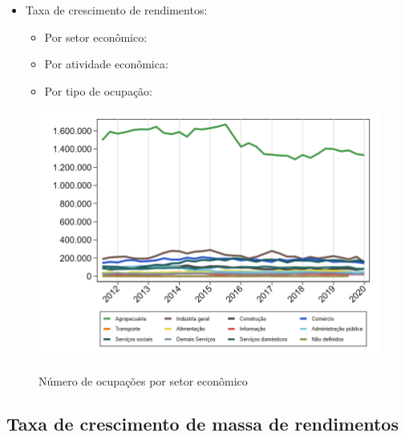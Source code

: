 \documentclass[8pt]{beamer}
\begin{document}
\begin{frame}[label=indice_principal_amz_rural]{}
\begin{itemize}
\item{Taxa de crescimento de rendimentos:
	\begin{itemize}
	\item{Por setor econômico: \hyperlink{amzruralrkngtxrendaporsetor}{}}
	\item{Por atividade econômica: \hyperlink{amzruralrkngtxrendaporatividade}{}}
	\item{Por tipo de ocupação: \hyperlink{amzruralrkngtxrendaporocupacao}{}}
	\end{itemize}
}
\vspace{1mm}

\end{itemize}

\end{frame}

\begin{frame}
\textit{\hyperlink{indice_principal_amz_rural}{}}
\begin{figure}
  \centering
  \includegraphics[width=.85\linewidth]{./../analysis/output/_amz_rural_importancia_relativa.png}
  \label{_amz_rural_importancia_relativa}
  \caption{{Número de ocupações por setor econômico}}
\end{figure}
\end{frame}

\subsection{Taxa de crescimento de massa de rendimentos}

\begin{frame}
\textit{\hyperlink{indice_principal_amz_rural}{}}

\end{frame}
\end{document}
